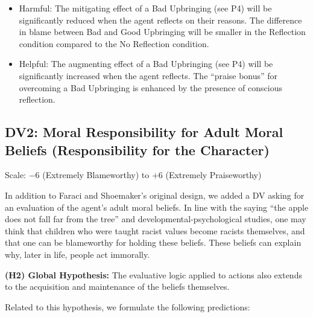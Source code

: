 \documentclass[scrarticle]{scrartcl}
\begin{document}
\begin{itemize}
   \begin{itemize}
      \item[--] Harmful: The mitigating effect of a Bad Upbringing (see P4) will be significantly reduced when the agent reflects on their reasons. The difference in blame between Bad and Good Upbringing will be smaller in the Reflection condition compared to the No Reflection condition.
      \item[--] Helpful: The augmenting effect of a Bad Upbringing (see P4) will be significantly increased when the agent reflects. The \enquote{praise bonus} for overcoming a Bad Upbringing is enhanced by the presence of conscious reflection.
   \end{itemize}
\end{itemize}


\subsection*{DV2: Moral Responsibility for Adult Moral Beliefs (Responsibility for the Character)}
Scale: $-6$ (Extremely Blameworthy) to $+6$ (Extremely Praiseworthy)

\vspace{0.75em}
\noindent In addition to Faraci and Shoemaker's original design, we added a DV asking for an evaluation of the agent's adult moral beliefs.
In line with the saying \enquote{the apple does not fall far from the tree} and developmental-psychological studies, one may think that children who were taught racist values become racists themselves, and that one can be blameworthy for holding these beliefs.
These beliefs can explain why, later in life, people act immorally.

\vspace{0.75em}
\noindent \textsf{\textbf{(H2) Global Hypothesis:}}
The evaluative logic applied to actions also extends to the acquisition and maintenance of the beliefs themselves.

\vspace{0.75em}
\noindent Related to this hypothesis, we formulate the following predictions:
\end{document}
